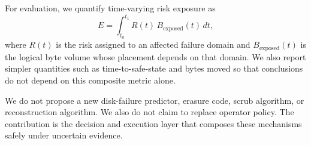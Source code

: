 For evaluation, we quantify time-varying risk exposure as
\begin{equation}
  E = \int_{t_0}^{t_1} R(t)\,B_{\mathrm{exposed}}(t)\,dt,
  \label{eq:risk-exposure}
\end{equation}
where $R(t)$ is the risk assigned to an affected failure domain and $B_{\mathrm{exposed}}(t)$ is the logical byte volume whose placement depends on that domain. We also report simpler quantities such as time-to-safe-state and bytes moved so that conclusions do not depend on this composite metric alone.

We do not propose a new disk-failure predictor, erasure code, scrub algorithm, or reconstruction algorithm. We also do not claim to replace operator policy. The contribution is the decision and execution layer that composes these mechanisms safely under uncertain evidence.
